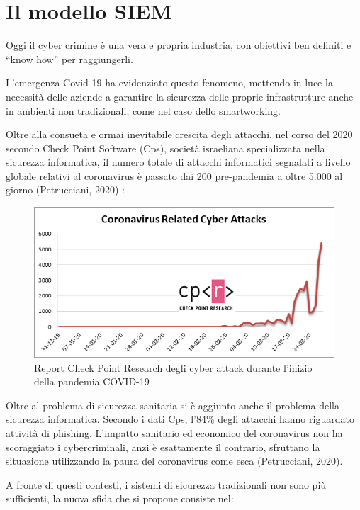 \chapter{Il modello SIEM}
\label{chap:Il modello SIEM}



Oggi il cyber crimine è una vera e propria industria, con obiettivi ben definiti e “know how” per raggiungerli. \par
L’emergenza Covid-19 ha evidenziato questo fenomeno, mettendo in luce la necessità delle aziende a garantire la sicurezza delle proprie infrastrutture anche in ambienti non tradizionali, come nel caso dello smartworking.\par
Oltre alla consueta e ormai inevitabile crescita degli attacchi, nel corso del 2020 secondo Check Point Software (Cps), società israeliana specializzata nella sicurezza informatica, il numero totale di attacchi informatici segnalati a livello globale relativi al coronavirus è passato dai 200 pre-pandemia a oltre 5.000 al giorno (Petrucciani, 2020) :



\begin{figure}[h]
    \begin{center}
        \includegraphics[scale=0.6]{images/1_modelloSIEM_img/cpr-coronavirus-graph-2-april.png}
    \end{center}
    \caption{Report Check Point Research degli cyber attack durante l'inizio della pandemia COVID-19}
    \label{fig:Dashboard QRadar}
\end{figure}

\newpage

Oltre al problema di sicurezza sanitaria si è aggiunto anche il problema della sicurezza informatica. Secondo i dati Cps, l’84\% degli attacchi hanno riguardato attività di phishing. L’impatto sanitario ed economico del coronavirus non ha scoraggiato i cybercriminali, anzi è esattamente il contrario, sfruttano la situazione utilizzando la paura del coronavirus come esca (Petrucciani, 2020). \par
A fronte di questi contesti, i sistemi di sicurezza tradizionali non sono più sufficienti, la nuova sfida che si propone consiste nel:


